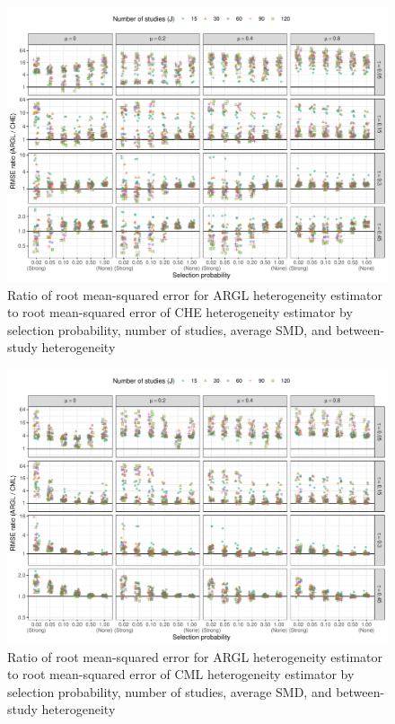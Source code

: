 \documentclass[
  american,
  man, donotrepeattitle,floatsintext]{apa7}
\begin{document}
\begin{figure}
\includegraphics{step-function-selection-models-with-dependent-effects_files/figure-latex/heterogeneity-rmse-ARGL-CHE-1} \caption{Ratio of root mean-squared error for ARGL heterogeneity estimator to root mean-squared error of CHE heterogeneity estimator by selection probability, number of studies, average SMD, and between-study heterogeneity}\label{fig:heterogeneity-rmse-ARGL-CHE}
\end{figure}

\begin{figure}
\includegraphics{step-function-selection-models-with-dependent-effects_files/figure-latex/heterogeneity-rmse-ARGL-CML-1} \caption{Ratio of root mean-squared error for ARGL heterogeneity estimator to root mean-squared error of CML heterogeneity estimator by selection probability, number of studies, average SMD, and between-study heterogeneity}\label{fig:heterogeneity-rmse-ARGL-CML}
\end{figure}
\end{document}
